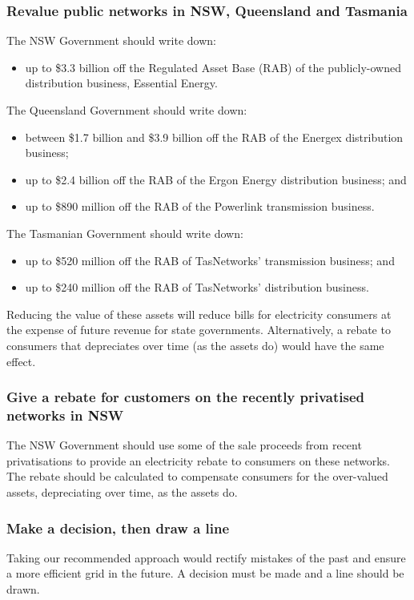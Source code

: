 \documentclass[FrontPage]{grattan}
\begin{document}
\begin{recommendations}

\subsubsection{Revalue public networks in NSW, Queensland and Tasmania}

The NSW Government should write down:
\begin{itemize}
 \item up to \$3.3 billion off the Regulated Asset Base (RAB) of the publicly-owned distribution business, Essential Energy.
\end{itemize}

The Queensland Government should write down:
\begin{itemize}
 \item between \$1.7 billion and \$3.9 billion off the RAB of the Energex distribution business;
 \item up to \$2.4 billion off the RAB of the Ergon Energy distribution business; and
 \item up to \$890 million off the RAB of the Powerlink transmission business.
\end{itemize}

The Tasmanian Government should write down:
\begin{itemize}
 \item up to \$520 million off the RAB of TasNetworks' transmission business; and 
 \item up to \$240 million off the RAB of TasNetworks' distribution business.
\end{itemize}

Reducing the value of these assets will reduce bills for electricity consumers at the expense of future revenue for state governments. Alternatively, a rebate to consumers that depreciates over time (as the assets do) would have the same effect. 

\subsubsection{Give a rebate for customers on the recently privatised networks in NSW}
The NSW Government should use some of the sale proceeds from recent privatisations to provide an electricity rebate to consumers on these networks. The rebate should be calculated to compensate consumers for the over-valued assets, depreciating over time, as the assets do.

\subsubsection{Make a decision, then draw a line}
Taking our recommended approach would rectify mistakes of the past and ensure a more efficient grid in the future. A decision must be made and a line should be drawn.


\end{recommendations}
\end{document}
